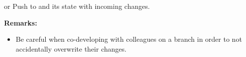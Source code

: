 \begin{frame}
\begin{block}{ or }
Push to  and  its state with incoming changes.
\end{block}
\textbf{Remarks:}
\begin{itemize}
\item Be careful when co-developing with colleagues on a branch in order to not accidentally overwrite their changes.
\end{itemize}
\end{frame}

%


